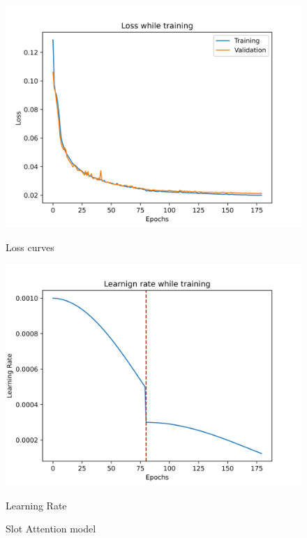 \begin{figure}[htbp]
  \centering
  \begin{minipage}[b]{0.45\textwidth}
    \centering
    \includegraphics[width=\textwidth]{images/loss_curves_part1.png}
    \caption{Loss curves}
    \label{fig:part1_loss}
  \end{minipage}
  \hfill
  \begin{minipage}[b]{0.45\textwidth}
    \centering
    \includegraphics[width=\textwidth]{images/learning_rate_part1.png}
    \caption{Learning Rate}
    \label{fig:part1_lr}
  \end{minipage}
  \caption{Slot Attention model}
\end{figure}


